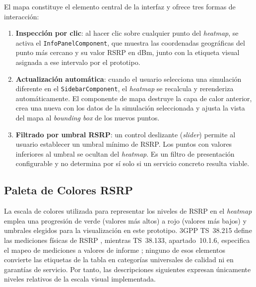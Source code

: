 El mapa constituye el elemento central de la interfaz y ofrece tres formas de interacción:

\begin{enumerate}
  \item \textbf{Inspección por clic}: al hacer clic sobre cualquier punto del
    \textit{heatmap}, se activa el \lstinline{InfoPanelComponent}, que muestra las
    coordenadas geográficas del punto más cercano y su valor RSRP en dBm, junto con la
    etiqueta visual asignada a ese intervalo por el prototipo.
  \item \textbf{Actualización automática}: cuando el usuario selecciona una simulación
    diferente en el \lstinline{SidebarComponent}, el \textit{heatmap} se recalcula y
    rerenderiza automáticamente. El componente de mapa destruye la capa de calor anterior,
    crea una nueva con los datos de la simulación seleccionada y ajusta la vista del mapa
    al \textit{bounding box} de los nuevos puntos.
  \item \textbf{Filtrado por umbral RSRP}: un control deslizante (\textit{slider}) permite
    al usuario establecer un umbral mínimo de RSRP. Los puntos con valores inferiores al
    umbral se ocultan del \textit{heatmap}. Es un filtro de presentación configurable y no
    determina por sí solo si un servicio concreto resulta viable.
\end{enumerate}

\subsection{Paleta de Colores RSRP}
\label{subsec:paleta_colores}

La escala de colores utilizada para representar los niveles de RSRP en el \textit{heatmap}
emplea una progresión de verde (valores más altos) a rojo (valores más bajos) y umbrales
elegidos para la visualización en este
prototipo. 3GPP TS~38.215 define las mediciones físicas de RSRP
\cite{3gpp_ts38215_2022}, mientras TS~38.133, apartado~10.1.6, especifica el mapeo de mediciones
a valores de informe \cite{etsi_ts138133_v153400_2026}; ninguno de esos elementos convierte
las etiquetas de la tabla en categorías universales de calidad ni en garantías de servicio.
Por tanto, las descripciones siguientes expresan únicamente niveles relativos de la escala
visual implementada.

